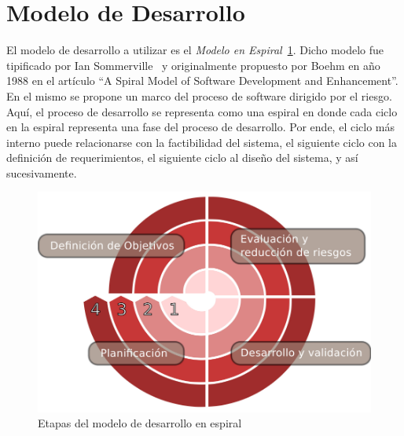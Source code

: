 \section{Modelo de Desarrollo}
El modelo de desarrollo a utilizar es el \textit{Modelo en
  Espiral}~\ref{fig:esquema}. Dicho modelo fue tipificado por Ian
Sommerville~\cite{Etiqueta00} y originalmente propuesto por Boehm en
año 1988 en el artículo ``A Spiral Model of Software Development and
Enhancement''. En el mismo se propone un marco del proceso de software
dirigido por el riesgo. Aquí, el proceso de desarrollo se representa
como una espiral en donde cada ciclo en la espiral representa una fase
del proceso de desarrollo. Por ende, el ciclo más interno puede
relacionarse con la factibilidad del sistema, el siguiente ciclo con
la definición de requerimientos, el siguiente ciclo al diseño del
sistema, y así sucesivamente.

\begin{figure}[h!]
 \begin{center}
  \includegraphics[width=1\textwidth,keepaspectratio=true]{./images/espiral.pdf}
  \caption{Etapas del modelo de desarrollo en espiral}
  \label{fig:esquema}
 \end{center}
\end{figure}

